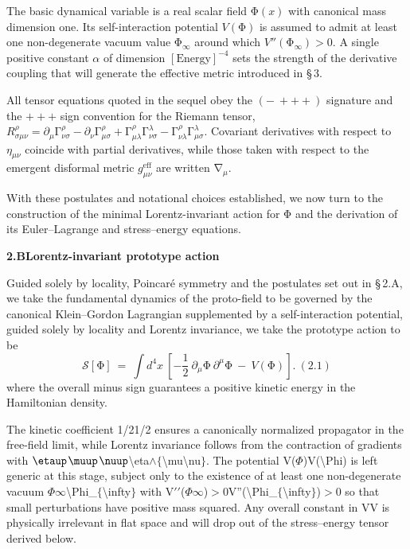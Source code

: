 \documentclass{iopjournal}
\begin{document}
The basic dynamical variable is a real scalar field $\mathrm{\Phi }\left(x\right)$ with canonical mass dimension one. Its self-interaction potential $V\left(\mathrm{\Phi }\right)$ is assumed to admit at least one non-degenerate vacuum value ${\mathrm{\Phi }}_∞$ around which $V''\left({\mathrm{\Phi }}_∞\right)>0$. A single positive constant $\alpha $ of dimension ${\left[\mathrm{Energy}\right]}^{-4}$ sets the strength of the derivative coupling that will generate the effective metric introduced in {\S} 3.

All tensor equations quoted in the sequel obey the $\left(-\ +++\right)$ signature and the $+++$ sign convention for the Riemann tensor,  $R^{\rho }_{\sigma \mu \nu }={\partial }_{\mu }{\mathrm{\Gamma }}^{\rho }_{\nu \sigma }-{\partial }_{\nu }{\mathrm{\Gamma }}^{\rho }_{\mu \sigma }+{\mathrm{\Gamma }}^{\rho }_{\mu \lambda }{\mathrm{\Gamma }}^{\lambda }_{\nu \sigma }-{\mathrm{\Gamma }}^{\rho }_{\nu \lambda }{\mathrm{\Gamma }}^{\lambda }_{\mu \sigma }$. Covariant derivatives with respect to ${\eta }_{\mu \nu }$ coincide with partial derivatives, while those taken with respect to the emergent disformal metric $g^{\mathrm{eff}}_{\mu \nu }$ are written ${\mathrm{\nabla }}_{\mu }$.

With these postulates and notational choices established, we now turn to the construction of the minimal Lorentz-invariant action for $\mathrm{\Phi }$ and the derivation of its Euler--Lagrange and stress--energy equations.


\textbf{2.B{\qquad}Lorentz-invariant prototype action}

Guided solely by locality, Poincar\'{e} symmetry and the postulates set out in {\S} 2.A, we take the fundamental dynamics of the proto-field to be governed by the canonical Klein--Gordon Lagrangian supplemented by a self-interaction potential, guided solely by locality and Lorentz invariance, we take the prototype action to be
\[\mathcal{S}\left[\mathrm{\Phi }\right]\ =\ \int{d^4}x\ \left[-\frac{1}{2}\ {\partial }_{\mu }\mathrm{\Phi }\ {\partial }^{\mu }\mathrm{\Phi }\ -\ V\left(\mathrm{\Phi }\right)\right].\ (2.1)\]
where the overall minus sign guarantees a positive kinetic energy in the Hamiltonian density.

The kinetic coefficient 1/21/2 ensures a canonically normalized propagator in the free-field limit, while Lorentz invariance follows from the contraction of gradients with $\etaup$$\muup$$\nuup${\textbackslash}eta$\mathrm{\wedge}$$\mathrm{\{}${\textbackslash}mu{\textbackslash}nu$\mathrm{\}}$. The potential V($\Phi$)V({\textbackslash}Phi) is left generic at this stage, subject only to the existence of at least one non-degenerate vacuum $\Phi$$\mathrm{\infty}${\textbackslash}Phi\_$\mathrm{\{}${\textbackslash}infty$\mathrm{\}}$ with V$\mathrm{\prime}$$\mathrm{\prime}$($\Phi$$\mathrm{\infty}$)$\mathrm{>}$0V''({\textbackslash}Phi\_$\mathrm{\{}${\textbackslash}infty$\mathrm{\}}$)$\mathrm{>}$0 so that small perturbations have positive mass squared. Any overall constant in VV is physically irrelevant in flat space and will drop out of the stress--energy tensor derived below.
\end{document}
